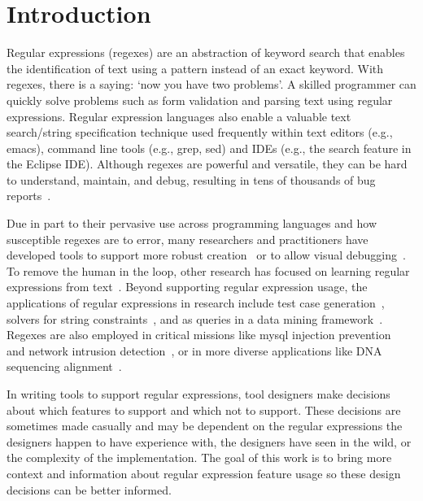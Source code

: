 \section{Introduction }

Regular expressions (regexes) are an abstraction of keyword search that enables the identification of text using a pattern instead of an exact keyword.  
With regexes, there is a  saying: `now you have two problems'.
A skilled programmer can quickly solve problems such as form validation and parsing text using regular expressions.  Regular expression languages also enable a valuable text search/string specification technique used frequently within text editors (e.g., emacs), command line tools (e.g., grep, sed) and IDEs (e.g., the search feature in the Eclipse IDE).  Although regexes are powerful and versatile, they can be hard to understand,  maintain, and debug, resulting in tens of thousands of bug reports~\cite{Spishak:2012:TSR:2318202.2318207}. 

Due in part to their pervasive use across programming languages and how susceptible regexes are to error, many researchers and practitioners have developed tools to support more robust creation~\cite{Spishak:2012:TSR:2318202.2318207} or to allow visual debugging~\cite{Beck:2014:RVD:2591062.2591111}. To remove the human in the loop, other research has focused on learning regular expressions from  text~\cite{Babbar:2010:CBA:1871840.1871848, Li:2008:REL:1613715.1613719}. 
Beyond supporting regular expression usage, the applications of regular expressions in research include test case generation~\cite{Ghosh:2013:JAT:2486788.2486925, Galler:2014:STD:2683035.2683100, Anand:2013:OSM:2503903.2503991, Tillmann:2014:TAT:2642937.2642941},  
solvers for string constraints~\cite{Trinh:2014:SSS:2660267.2660372, hampi}, and as queries in a data mining framework~\cite{Begel:2010:CDE:1806799.1806821}.
Regexes are also employed in critical missions like mysql injection prevention~\cite{Yeole:2011:ADT:1980022.1980229} and network intrusion detection~\cite{network}, or in more diverse applications like DNA sequencing alignment~\cite{1594922}. 


In writing tools to support regular expressions, tool designers make decisions about which features to support and which not to support. These decisions are sometimes made casually and may be dependent on the regular expressions the designers happen to have experience with, the designers have seen in the wild, or the complexity of the implementation. The goal of this work is to bring more context and information about regular expression feature usage so these design decisions can be better informed.

